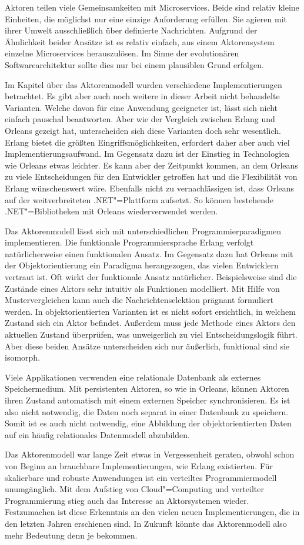 Aktoren teilen viele Gemeinsamkeiten mit Microservices. Beide sind relativ kleine Einheiten, die möglichst nur eine einzige Anforderung erfüllen. Sie agieren mit ihrer Umwelt ausschließlich über definierte Nachrichten. Aufgrund der Ähnlichkeit beider Ansätze ist es relativ einfach, aus einem Aktorensystem einzelne Microservices herauszulösen. Im Sinne der evolutionären Softwarearchitektur sollte dies nur bei einem plausiblen Grund erfolgen.

Im Kapitel über das Aktorenmodell wurden verschiedene Implementierungen betrachtet. Es gibt aber auch noch weitere in dieser Arbeit nicht behandelte Varianten. Welche davon für eine Anwendung geeigneter ist, lässt sich nicht einfach pauschal beantworten. Aber wie der Vergleich zwischen Erlang und Orleans gezeigt hat, unterscheiden sich diese Varianten doch sehr wesentlich. Erlang bietet die größten Eingriffsmöglichkeiten, erfordert daher aber auch viel Implementierungsaufwand. Im Gegensatz dazu ist der Einstieg in Technologien wie Orleans etwas leichter. Es kann aber der Zeitpunkt kommen, an dem Orleans zu viele Entscheidungen für den Entwickler getroffen hat und die Flexibilität von Erlang wünschenswert wäre. Ebenfalls nicht zu vernachlässigen ist, dass Orleans auf der weitverbreiteten .NET"=Plattform aufsetzt. So können bestehende .NET"=Bibliotheken mit Orleans wiederverwendet werden.

Das Aktorenmodell lässt sich mit unterschiedlichen Programmierparadigmen implementieren. Die funktionale Programmiersprache Erlang verfolgt natürlicherweise einen funktionalen Ansatz. Im Gegensatz dazu hat Orleans mit der Objektorientierung ein Paradigma herangezogen, das vielen Entwicklern vertraut ist. Oft wirkt der funktionale Ansatz natürlicher. Beispielsweise sind die Zustände eines Aktors sehr intuitiv als Funktionen modelliert. Mit Hilfe von Mustervergleichen kann auch die Nachrichtenselektion prägnant formuliert werden. In objektorientierten Varianten ist es nicht sofort ersichtlich, in welchem Zustand sich ein Aktor befindet. Außerdem muss jede Methode eines Aktors den aktuellen Zustand überprüfen, was unweigerlich zu viel Entscheidungslogik führt. Aber diese beiden Ansätze unterscheiden sich nur äußerlich, funktional sind sie isomorph.

Viele Applikationen verwenden eine relationale Datenbank als externes Speichermedium. Mit persistenten Aktoren, so wie in Orleans, können Aktoren ihren Zustand automatisch mit einem externen Speicher synchronisieren. Es ist also nicht notwendig, die Daten noch separat in einer Datenbank zu speichern. Somit ist es auch nicht notwendig, eine Abbildung der objektorientierten Daten auf ein häufig relationales Datenmodell abzubilden.

Das Aktorenmodell war lange Zeit etwas in Vergessenheit geraten, obwohl schon von Beginn an brauchbare Implementierungen, wie \zB Erlang existierten. Für skalierbare und robuste Anwendungen ist ein verteiltes Programmiermodell unumgänglich. Mit dem Aufstieg von Cloud"=Computing und verteilter Programmierung stieg auch das Interesse an Aktorsystemen wieder. Festzumachen ist diese Erkenntnis an den vielen neuen Implementierungen, die in den letzten Jahren erschienen sind. In Zukunft könnte das Aktorenmodell also mehr Bedeutung denn je bekommen.